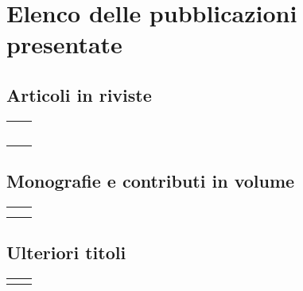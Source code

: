 \section*{Elenco delle pubblicazioni presentate}
\subsection*{Articoli in riviste}
\begin{center}
\begin{tabularx}{\textwidth}{p{}p{}}
	\myTextField[1.5cm]{} & \titleTextField[.75\textwidth]{} \\[.5em]
	\myTextField[1.5cm]{} & \titleTextField[.75\textwidth]{} \\[.5em]
	\myTextField[1.5cm]{} & \titleTextField[.75\textwidth]{} \\[.5em]
	\myTextField[1.5cm]{} & \titleTextField[.75\textwidth]{} \\[.5em]
	\myTextField[1.5cm]{} & \titleTextField[.75\textwidth]{}
\end{tabularx}
\end{center}
\subsection*{Monografie e contributi in volume}
\begin{center}
\begin{tabularx}{\textwidth}{p{}p{}}
	\myTextField[1.5cm]{} & \titleTextField[.75\textwidth]{} \\[.5em]
	\myTextField[1.5cm]{} & \titleTextField[.75\textwidth]{}
\end{tabularx}
\end{center}
\subsection*{Ulteriori titoli}
\begin{center}
\begin{tabularx}{\textwidth}{p{}p{}}
	\myTextField[1.5cm]{} & \titleTextField[.75\textwidth]{}
\end{tabularx}
\end{center}
